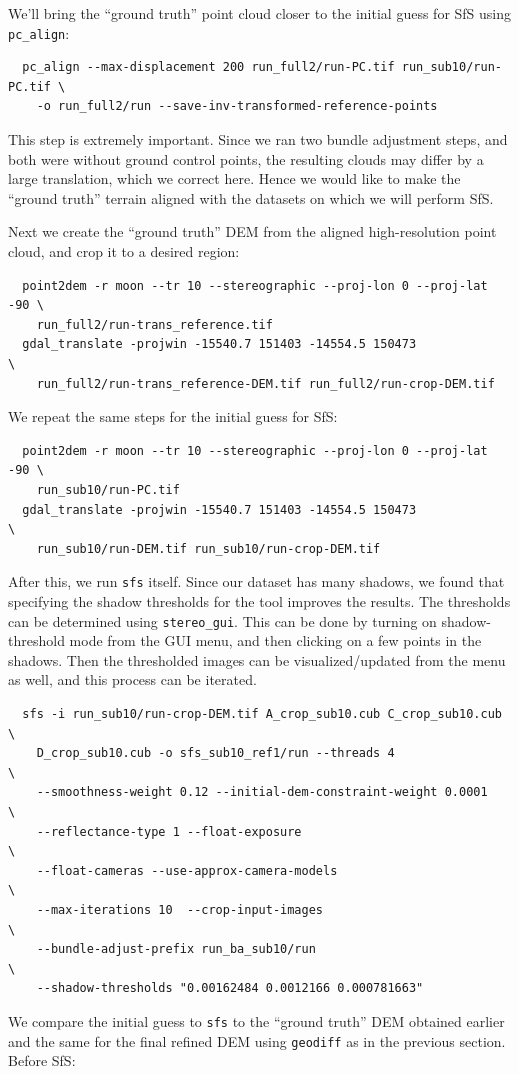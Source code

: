 We'll bring the ``ground truth'' point cloud closer to the initial guess
for SfS using \texttt{pc\_align}:
\begin{verbatim}
  pc_align --max-displacement 200 run_full2/run-PC.tif run_sub10/run-PC.tif \
    -o run_full2/run --save-inv-transformed-reference-points
\end{verbatim}
This step is extremely important. Since we ran two bundle adjustment
steps, and both were without ground control points, the resulting clouds
may differ by a large translation, which we correct here. Hence we would like to 
make the ``ground truth'' terrain aligned with the datasets on which we 
will perform SfS. 

Next we create the ``ground truth'' DEM from the aligned high-resolution
point cloud, and crop it to a desired region:
\begin{verbatim}
  point2dem -r moon --tr 10 --stereographic --proj-lon 0 --proj-lat -90 \
    run_full2/run-trans_reference.tif
  gdal_translate -projwin -15540.7 151403 -14554.5 150473               \
    run_full2/run-trans_reference-DEM.tif run_full2/run-crop-DEM.tif
\end{verbatim}
We repeat the same steps for the initial guess for SfS:
\begin{verbatim}
  point2dem -r moon --tr 10 --stereographic --proj-lon 0 --proj-lat -90 \
    run_sub10/run-PC.tif
  gdal_translate -projwin -15540.7 151403 -14554.5 150473               \
    run_sub10/run-DEM.tif run_sub10/run-crop-DEM.tif
\end{verbatim}
After this, we run \texttt{sfs} itself. Since our dataset has many shadows, we found
that specifying the shadow thresholds for the tool improves the
results. The thresholds can be determined using \texttt{stereo\_gui}.
This can be done by turning on shadow-threshold mode from the GUI menu, 
and then clicking on a few points in the shadows.  Then the thresholded images
can be visualized/updated from the menu as well, and this process can be iterated.
\begin{verbatim}
  sfs -i run_sub10/run-crop-DEM.tif A_crop_sub10.cub C_crop_sub10.cub \
    D_crop_sub10.cub -o sfs_sub10_ref1/run --threads 4                \
    --smoothness-weight 0.12 --initial-dem-constraint-weight 0.0001   \
    --reflectance-type 1 --float-exposure                             \
    --float-cameras --use-approx-camera-models                        \
    --max-iterations 10  --crop-input-images                          \
    --bundle-adjust-prefix run_ba_sub10/run                           \
    --shadow-thresholds "0.00162484 0.0012166 0.000781663"
\end{verbatim}
We compare the initial guess to \texttt{sfs} to the ``ground truth'' DEM
obtained earlier and the same for the final refined DEM using
\texttt{geodiff} as in the previous section. Before SfS:

